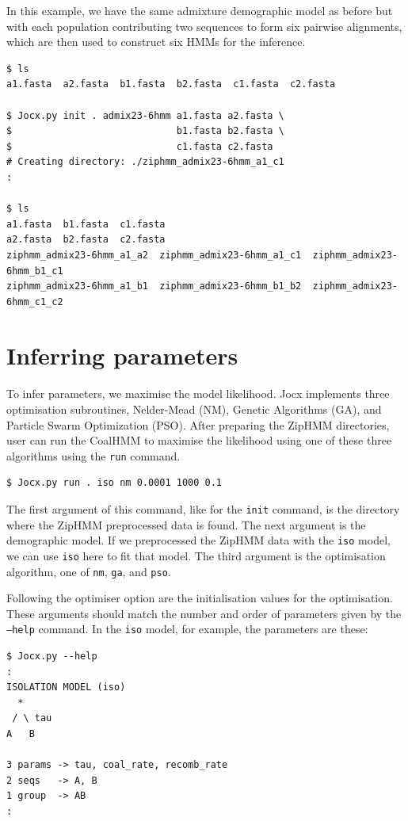 \documentclass[graybox]{svmult}
\begin{document}
In this example, we have the same admixture demographic model as before but with each population contributing two sequences to form six pairwise alignments, which are then used to construct six HMMs for the inference.

 {\scriptsize{}\begin{verbatim}
$ ls
a1.fasta  a2.fasta  b1.fasta  b2.fasta  c1.fasta  c2.fasta

$ Jocx.py init . admix23-6hmm a1.fasta a2.fasta \
$                             b1.fasta b2.fasta \
$                             c1.fasta c2.fasta
# Creating directory: ./ziphmm_admix23-6hmm_a1_c1
:

$ ls
a1.fasta  b1.fasta  c1.fasta
a2.fasta  b2.fasta  c2.fasta
ziphmm_admix23-6hmm_a1_a2  ziphmm_admix23-6hmm_a1_c1  ziphmm_admix23-6hmm_b1_c1
ziphmm_admix23-6hmm_a1_b1  ziphmm_admix23-6hmm_b1_b2  ziphmm_admix23-6hmm_c1_c2
\end{verbatim}}

\section{Inferring parameters}

To infer parameters, we maximise the model likelihood. Jocx implements three optimisation subroutines, Nelder-Mead (NM), Genetic Algorithms (GA), and Particle Swarm Optimization (PSO). After preparing the ZipHMM directories, user can run the CoalHMM to maximise the likelihood using one of these three algorithms using the \texttt{run} command.

 {\scriptsize{}\begin{verbatim}
$ Jocx.py run . iso nm 0.0001 1000 0.1
\end{verbatim}}

The first argument of this command, like for the \texttt{init} command, is the directory where the ZipHMM preprocessed data is found. The next argument is the demographic model. If we preprocessed the ZipHMM data with the \texttt{iso} model, we can use \texttt{iso} here to fit that model. The third argument is the optimisation algorithm, one of \texttt{nm}, \texttt{ga}, and \texttt{pso}.

Following the optimiser option are the initialisation values for the optimisation. These arguments should match the number and order of parameters given by the \texttt{--help} command. In the \texttt{iso} model, for example, the parameters are these:

 {\scriptsize{}\begin{verbatim}
$ Jocx.py --help
:
ISOLATION MODEL (iso)
  *
 / \ tau
A   B

3 params -> tau, coal_rate, recomb_rate
2 seqs   -> A, B
1 group  -> AB
:
\end{verbatim}}
\end{document}
